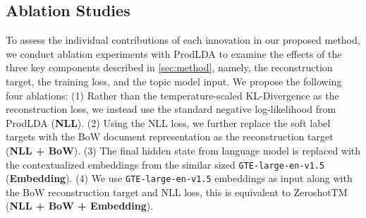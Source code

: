 \documentclass{article}
\theoremstyle{plain}
\theoremstyle{definition}
\theoremstyle{remark}
\begin{document}
\subsection{Ablation Studies}
To assess the individual contributions of each innovation in our proposed method, we conduct ablation experiments with ProdLDA to examine the effects of the three key components described in \autoref{sec:method}, namely, the reconstruction target, the training loss, and the topic model input. We propose the following four ablations: (1) Rather than the temperature-scaled KL-Divergence as the reconstruction loss, we instead use the standard negative log-likelihood from ProdLDA (\textbf{NLL}). (2) Using the NLL loss, we further replace the soft label targets with the BoW document representation as the reconstruction target (\textbf{NLL + BoW}). (3) The final hidden state from language model is replaced with the contextualized embeddings from the similar sized \texttt{GTE-large-en-v1.5} (\textbf{Embedding}). (4) We use \texttt{GTE-large-en-v1.5} embeddings as input along with the BoW reconstruction target and NLL loss, this is equivalent to ZeroshotTM \citep{bianchi-etal-2021-pre} (\textbf{NLL + BoW + Embedding}).

\end{document}

